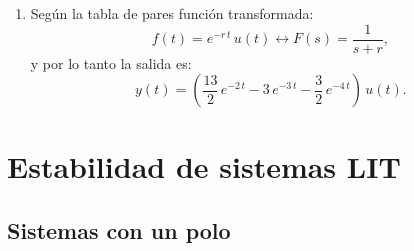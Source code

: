 \begin{enumerate}
	\item Según la tabla de pares función transformada:
	\begin{equation}
		f(t) = e^{-r \, t} \, u(t) \leftrightarrow F(s) = \frac{1}{s+r},
	\end{equation}
	y por lo tanto la salida es:
	\begin{equation}
		y(t) = \left(\frac{13}{2} \, e^{-2 \, t} - 3 \, e^{-3 \, t} - \frac{3}{2} \, e^{-4 \, t}\right) \, u(t).
	\end{equation}
\end{enumerate}

\section{Estabilidad de sistemas LIT}

\subsection{Sistemas con un polo}

